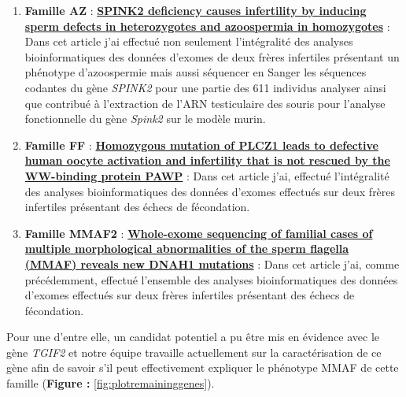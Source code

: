 \documentclass[12pt,twoside]{reedthesis}
\providecommand{\tightlist}{%
  \setlength{\itemsep}{0pt}\setlength{\parskip}{0pt}}
\theoremstyle{definition}
\theoremstyle{definition}
\theoremstyle{remark}
\begin{document}
  \begin{enumerate}
  \def\labelenumi{\arabic{enumi}.}
  \tightlist
  \item
    \textbf{Famille AZ} : \protect\hyperlink{spink2}{\textbf{SPINK2
    deficiency causes infertility by inducing sperm defects in
    heterozygotes and azoospermia in homozygotes}} : Dans cet article j'ai
    effectué non seulement l'intégralité des analyses bioinformatiques des
    données d'exomes de deux frères infertiles présentant un phénotype
    d'azoospermie mais aussi séquencer en Sanger les séquences codantes du
    gène \emph{SPINK2} pour une partie des 611 individus analyser ainsi
    que contribué à l'extraction de l'ARN testiculaire des souris pour
    l'analyse fonctionnelle du gène \emph{Spink2} sur le modèle murin.\\
  \item
    \textbf{Famille FF} : \protect\hyperlink{plcz}{\textbf{Homozygous
    mutation of PLCZ1 leads to defective human oocyte activation and
    infertility that is not rescued by the WW-binding protein PAWP}} :
    Dans cet article j'ai, effectué l'intégralité des analyses
    bioinformatiques des données d'exomes effectués sur deux frères
    infertiles présentant des échecs de fécondation.\\
  \item
    \textbf{Famille MMAF2} :
    \protect\hyperlink{famdnah1}{\textbf{Whole-exome sequencing of
    familial cases of multiple morphological abnormalities of the sperm
    flagella (MMAF) reveals new DNAH1 mutations}} : Dans cet article j'ai,
    comme précédemment, effectué l'ensemble des analyses bioinformatiques
    des données d'exomes effectués sur deux frères infertiles présentant
    des échecs de fécondation.
  \end{enumerate}
  
  Pour une d'entre elle, un candidat potentiel a pu être mis en évidence
  avec le gène \emph{TGIF2} et notre équipe travaille actuellement sur la
  caractérisation de ce gène afin de savoir s'il peut effectivement
  expliquer le phénotype MMAF de cette famille (\textbf{Figure :
  }\ref{fig:plotremaininggenes}).
  
\end{document}

